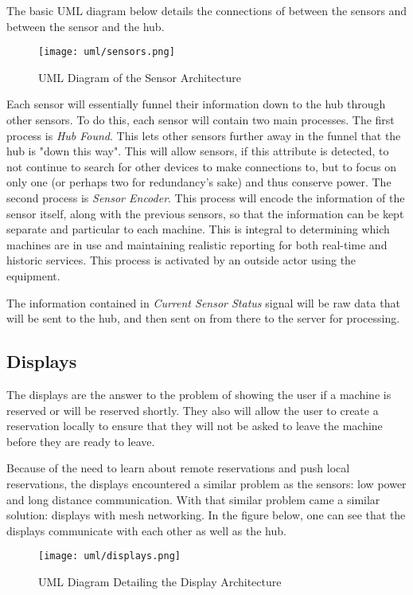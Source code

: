 \documentclass[PPFS.tex]{template/subfiles}
\begin{document}
The basic UML diagram below details the connections of between the sensors and between the sensor and the hub.

\begin{figure}[H]
    \centering
    \texttt{[image: uml/sensors.png]}
    \caption{UML Diagram of the Sensor Architecture}
\end{figure}

Each sensor will essentially funnel their information down to the hub through other sensors. To do this, each sensor will contain two main processes. The first process is \textit{Hub Found}. This lets other sensors further away in the funnel that the hub is "down this way". This will allow sensors, if this attribute is detected, to not continue to search for other devices to make connections to, but to focus on only one (or perhaps two for redundancy's sake) and thus conserve power. The second process is \textit{Sensor Encoder}. This process will encode the information of the sensor itself, along with the previous sensors, so that the information can be kept separate and particular to each machine. This is integral to determining which machines are in use and maintaining realistic reporting for both real-time and historic services. This process is activated by an outside actor using the equipment.

The information contained in \textit{Current Sensor Status} signal will be raw data that will be sent to the hub, and then sent on from there to the server for processing.

\subsection{Displays}

The displays are the answer to the problem of showing the user if a machine is reserved or will be reserved shortly. They also will allow the user to create a reservation locally to ensure that they will not be asked to leave the machine before they are ready to leave.


Because of the need to learn about remote reservations and push local reservations, the displays encountered a similar problem as the sensors: low power and long distance communication. With that similar problem came a similar solution: displays with mesh networking. In the figure below, one can see that the displays communicate with each other as well as the hub.

\begin{figure}[H]
    \centering
    \texttt{[image: uml/displays.png]}
    \caption{UML Diagram Detailing the Display Architecture}
\end{figure}
\end{document}
